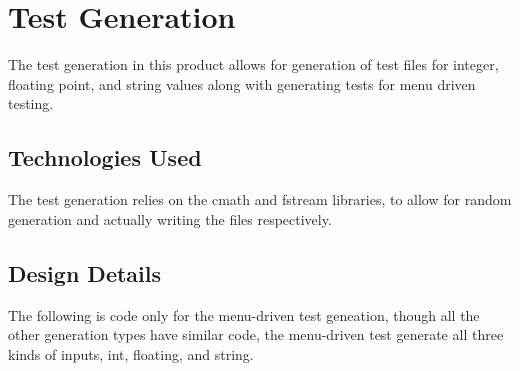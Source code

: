\section {Test Generation}
The test generation in this product allows for generation of test files for integer, floating point, and string values
along with generating tests for menu driven testing.

\subsection {Technologies Used}
The test generation relies on the cmath and fstream libraries, to allow for random generation and actually
writing the files respectively.

\subsection {Design Details}
The following is code only for the menu-driven test geneation, though all the other generation types
have similar code, the menu-driven test generate all three kinds of inputs, int, floating, and string.

